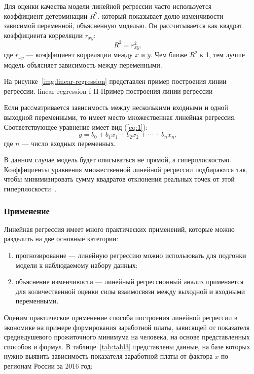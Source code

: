 Для оценки качества модели линейной регрессии часто используется коэффициент детерминации $R^2$, который показывает долю изменчивости зависимой переменной, объясненную моделью.
Он рассчитывается как квадрат коэффициента корреляции $r_{xy}$:
\begin{equation}
    R^2 = r_{xy}^2,
\end{equation}
где $r_{xy}$ --- коэффициент корреляции между $x$ и $y$.
Чем ближе $R^2$ к 1, тем лучше модель объясняет зависимость между переменными.

На рисунке~\ref{img:linear-regression} представлен пример построения линии регрессии.
{linear-regression}
{f}
{H}
{\textwidth}
{Пример построения линии регрессии}

Если рассматривается зависимость между несколькими входными и одной выходной переменными, то имеет место множественная линейная регрессия.
Соответствующее уравнение имеет вид (\ref{eq:1}):
\begin{equation}
    y = b_0 + b_1 x_1 + b_2 x_2 + \cdots+ b_n x_n,
    \label{eq:1}
\end{equation}
где $n$ --- число входных переменных.

В данном случае модель будет описываться не прямой, а гиперплоскостью.
Коэффициенты уравнения множественной линейной регрессии подбираются так, чтобы минимизировать сумму квадратов отклонения реальных точек от этой гиперплоскости~\cite{loginom}.

\subsubsection*{Применение}

Линейная регрессия имеет много практических применений, которые можно разделить на две основные категории:
\begin{enumerate}[label=\arabic*), leftmargin=1.6\parindent]
    \item прогнозирование --- линейную регрессию можно использовать для подгонки модели к наблюдаемому набору данных;
    \item объяснение изменчивости --- линейный регрессионный анализ применяется для количественной оценки силы взаимосвязи между выходной и входными переменными.
\end{enumerate}

Оценим практическое применение способа построения линейной регрессии в экономике на примере формирования заработной платы, зависящей от показателя среднедушевого прожиточного минимума на человека, на основе представленных способов и формул.
В таблице~\ref{tab:tabl3} представлены данные, на базе которых нужно выявить зависимость показателя заработной платы от фактора $x$ по регионам России за 2016 год:

